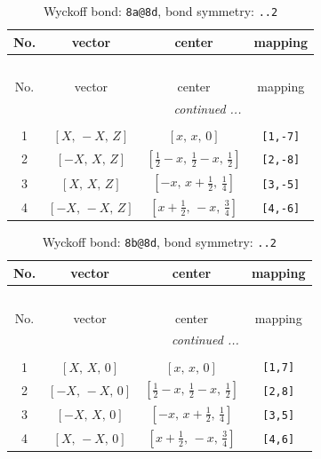 \documentclass[fleqn,8pt]{jsarticle}
\begin{document}
\begin{longtable}{cccc}
\caption{Wyckoff bond: {\tt 8a@8d}, bond symmetry: {\tt ..2}}
 \\
 \hline \hline
No. & vector & center & mapping \\ \hline \endfirsthead

\multicolumn{3}{l}{\tablename\ \thetable{}} \\
 \hline \hline
No. & vector & center & mapping \\ \hline \endhead

 \hline \hline
\multicolumn{3}{r}{\footnotesize\it continued ...} \\ \endfoot

 \hline \hline
\multicolumn{3}{r}{} \\ \endlastfoot

1 & $\left[ X,\, - X,\, Z \right]$ & $\left[ x,\, x,\, 0 \right]$ & {\tt [1,-7]} \\ \hline
2 & $\left[ - X,\, X,\, Z \right]$ & $\left[ \frac{1}{2} - x,\, \frac{1}{2} - x,\, \frac{1}{2} \right]$ & {\tt [2,-8]} \\ \hline
3 & $\left[ X,\, X,\, Z \right]$ & $\left[ - x,\, x + \frac{1}{2},\, \frac{1}{4} \right]$ & {\tt [3,-5]} \\ \hline
4 & $\left[ - X,\, - X,\, Z \right]$ & $\left[ x + \frac{1}{2},\, - x,\, \frac{3}{4} \right]$ & {\tt [4,-6]} \\
\end{longtable}
\renewcommand{\arraystretch}{1.2}
\begin{longtable}{cccc}
\caption{Wyckoff bond: {\tt 8b@8d}, bond symmetry: {\tt ..2}}
 \\
 \hline \hline
No. & vector & center & mapping \\ \hline \endfirsthead

\multicolumn{3}{l}{\tablename\ \thetable{}} \\
 \hline \hline
No. & vector & center & mapping \\ \hline \endhead

 \hline \hline
\multicolumn{3}{r}{\footnotesize\it continued ...} \\ \endfoot

 \hline \hline
\multicolumn{3}{r}{} \\ \endlastfoot

1 & $\left[ X,\, X,\, 0 \right]$ & $\left[ x,\, x,\, 0 \right]$ & {\tt [1,7]} \\ \hline
2 & $\left[ - X,\, - X,\, 0 \right]$ & $\left[ \frac{1}{2} - x,\, \frac{1}{2} - x,\, \frac{1}{2} \right]$ & {\tt [2,8]} \\ \hline
3 & $\left[ - X,\, X,\, 0 \right]$ & $\left[ - x,\, x + \frac{1}{2},\, \frac{1}{4} \right]$ & {\tt [3,5]} \\ \hline
4 & $\left[ X,\, - X,\, 0 \right]$ & $\left[ x + \frac{1}{2},\, - x,\, \frac{3}{4} \right]$ & {\tt [4,6]} \\
\end{longtable}
\end{document}
